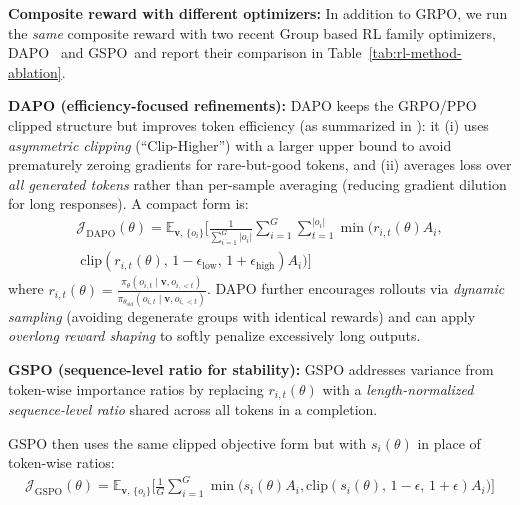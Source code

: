\documentclass{article}
\theoremstyle{plain}
\theoremstyle{definition}
\theoremstyle{remark}
\begin{document}
\textbf{Composite reward with different optimizers:}
In addition to GRPO, we run the \emph{same} composite reward with two recent Group based RL family optimizers, DAPO~\citep{yu2025dapoopensourcellmreinforcement} and GSPO~\citep{zheng2025groupsequencepolicyoptimization}and report their comparison in Table~\ref{tab:rl-method-ablation}.

\textbf{DAPO (efficiency-focused refinements):}
DAPO keeps the GRPO/PPO clipped structure but improves token efficiency (as summarized in \citet{yu2025dapoopensourcellmreinforcement}): it (i) uses \emph{asymmetric clipping} (“Clip-Higher”) with a larger upper bound to avoid prematurely zeroing gradients for rare-but-good tokens, and (ii) averages loss over \emph{all generated tokens} rather than per-sample averaging (reducing gradient dilution for long responses). A compact form is:
{\scriptsize
\begin{equation}
\begin{split}
\mathcal{J}_{\text{DAPO}}(\theta)
=\mathbb{E}_{\mathbf{v},\,\{o_i\}}
\Bigg[
\frac{1}{\sum_{i=1}^G |o_i|}\sum_{i=1}^G\sum_{t=1}^{|o_i|} 
\min\!\Big(r_{i,t}(\theta)A_i, \\\;\mathrm{clip}(r_{i,t}(\theta),\,1-\epsilon_{\text{low}},\,1+\epsilon_{\text{high}})A_i\Big)
\Bigg]
\end{split}
\label{eq:DAPO}
\end{equation}
}
where $r_{i,t}(\theta)=\frac{\pi_\theta(o_{i,t}\mid \mathbf{v},o_{i,<t})}{\pi_{\theta_{\text{old}}}(o_{i,t}\mid \mathbf{v},o_{i,<t})}$.
DAPO further encourages rollouts via \emph{dynamic sampling} (avoiding degenerate groups with identical rewards) and can apply \emph{overlong reward shaping} to softly penalize excessively long outputs.

\textbf{GSPO (sequence-level ratio for stability):}
GSPO addresses variance from token-wise importance ratios by replacing $r_{i,t}(\theta)$ with a \emph{length-normalized sequence-level ratio} shared across all tokens in a completion.

GSPO then uses the same clipped objective form but with $s_i(\theta)$ in place of token-wise ratios:
{\scriptsize
\begin{equation}
\begin{split}
\mathcal{J}_{\text{GSPO}}(\theta)
=\mathbb{E}_{\mathbf{v},\,\{o_i\}}\Bigg[
\frac{1}{G}\sum_{i=1}^G
\min\!\Big(s_i(\theta)A_i,\mathrm{clip}(s_i(\theta),\,1-\epsilon,\,1+\epsilon)A_i\Big)
\Bigg]
\end{split}
\label{eq:GSPO}
\end{equation}
}
\end{document}
